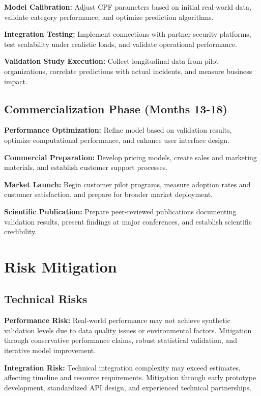 \documentclass[10pt,twocolumn]{IEEEtran}
\begin{document}
\textbf{Model Calibration:} Adjust CPF parameters based on initial real-world data, validate category performance, and optimize prediction algorithms.

\textbf{Integration Testing:} Implement connections with partner security platforms, test scalability under realistic loads, and validate operational performance.

\textbf{Validation Study Execution:} Collect longitudinal data from pilot organizations, correlate predictions with actual incidents, and measure business impact.

\subsection{Commercialization Phase (Months 13-18)}

\textbf{Performance Optimization:} Refine model based on validation results, optimize computational performance, and enhance user interface design.

\textbf{Commercial Preparation:} Develop pricing models, create sales and marketing materials, and establish customer support processes.

\textbf{Market Launch:} Begin customer pilot programs, measure adoption rates and customer satisfaction, and prepare for broader market deployment.

\textbf{Scientific Publication:} Prepare peer-reviewed publications documenting validation results, present findings at major conferences, and establish scientific credibility.

\section{Risk Mitigation}

\subsection{Technical Risks}

\textbf{Performance Risk:} Real-world performance may not achieve synthetic validation levels due to data quality issues or environmental factors. Mitigation through conservative performance claims, robust statistical validation, and iterative model improvement.

\textbf{Integration Risk:} Technical integration complexity may exceed estimates, affecting timeline and resource requirements. Mitigation through early prototype development, standardized API design, and experienced technical partnerships.
\end{document}
